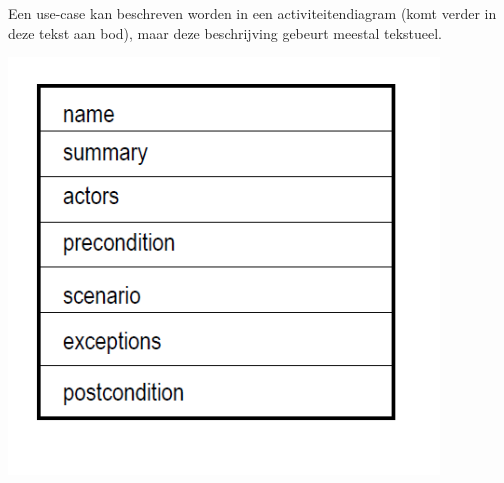 Een use-case kan beschreven worden in een activiteitendiagram (komt verder in deze tekst aan bod), maar deze beschrijving gebeurt meestal tekstueel.


\begin{center}
\includegraphics[width=4.5in]{img/usecase2}%
\end{center}

